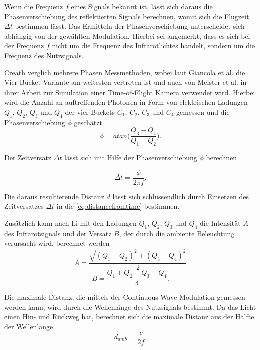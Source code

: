 \documentclass[thesis.tex]{subfiles}
\begin{document}
Wenn die Frequenz $f$ eines Signals bekannt ist, lässt sich daraus die Phasenverschiebung des reflektierten Signals berechnen, womit sich die Flugzeit $\Delta t$ bestimmen lässt. Das Ermitteln der Phasenverschiebung unterscheidet sich abhängig von der gewählten Modulation. Hierbei sei angemerkt, dass es sich bei der Frequenz $f$ nicht um die Frequenz des Infrarotlichtes handelt, sondern um die Frequenz des Nutzsignals.

Creath \cite{bib:Creath88} verglich mehrere Phasen Messmethoden, wobei laut Giancola et al. \cite{bib:Giancola2018} die Vier Bucket Variante am weitesten vertreten ist und auch von Meister et al. \cite{bib:Meister2013} in ihrer Arbeit zur Simulation einer Time-of-Flight Kamera verwendet wird. Hierbei wird die Anzahl an auftreffenden Photonen in Form von elektrischen Ladungen $Q_1$, $Q_2$, $Q_3$ und $Q_4$ der vier Buckets $C_1$, $C_2$, $C_3$ und $C_4$ gemessen und die Phasenverschiebung $\phi$ geschätzt
\begin{equation}\phi = atan\Big(\frac{Q_3 - Q_4}{Q_1 - Q_2}\Big).\label{eq:phasefromcharge}\end{equation}

Der Zeitversatz $\Delta t$ lässt sich mit Hilfe der Phasenverschiebung $\phi$ berechnen

\begin{equation}\Delta t = \frac{\phi}{2 \pi f}.\label{eq:timefromphase}\end{equation}

Die daraus resultierende Distanz $d$ lässt sich schlussendlich durch Einsetzen des Zeitversatzes $\Delta t$ in die \autoref{eq:distancefromtime} bestimmen.

Zusätzlich kann nach Li \cite{bib:Li2014} mit den Ladungen $Q_1$, $Q_2$, $Q_3$ und $Q_4$ die Intensität $A$ des Infrarotsignals und der Versatz $B$, der durch die ambiente Beleuchtung verursacht wird, berechnet werden
\begin{equation}A = \frac{\sqrt{(Q_1-Q_2)^2+(Q_3-Q_4)^2}}{2}\end{equation}
\begin{equation}B = \frac{Q_1+Q_2+Q_3+Q_4}{4}.\end{equation}

Die maximale Distanz, die mittels der Continuous-Wave Modulation gemessen werden kann, wird durch die Wellenlänge des Nutzsignals bestimmt. Da das Licht einen Hin- und Rückweg hat, berechnet sich die maximale Distanz aus der Hälfte der Wellenlänge \begin{equation}d_{amb} = \frac{c}{2 f}.\end{equation}
\end{document}
